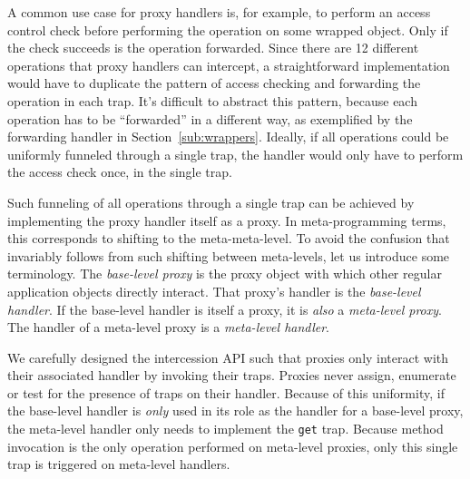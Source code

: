 \documentclass{sig-alternate}
\begin{document}
A common use case for proxy handlers is, for example, to perform an access control check before performing the operation on some wrapped object. Only if the check succeeds is the operation forwarded. Since there are 12 different operations that proxy handlers can intercept, a straightforward implementation would have to duplicate the pattern of access checking and forwarding the operation in each trap. It's difficult to abstract this pattern, because each operation has to be ``forwarded'' in a different way, as exemplified by the forwarding handler in Section~\ref{sub:wrappers}. Ideally, if all operations could be uniformly funneled through a single trap, the handler would only have to perform the access check once, in the single trap.

Such funneling of all operations through a single trap can be achieved by implementing the proxy handler itself as a proxy. In meta-programming terms, this corresponds to shifting to the meta-meta-level. To avoid the confusion that invariably follows from such shifting between meta-levels, let us introduce some terminology. The \emph{base-level proxy} is the proxy object with which other regular application objects directly interact. That proxy's handler is the \emph{base-level handler}. If the base-level handler is itself a proxy, it is \emph{also} a \emph{meta-level proxy}. The handler of a meta-level proxy is a \emph{meta-level handler}.

We carefully designed the intercession API such that proxies only interact with their associated handler by invoking their traps. Proxies never assign, enumerate or test for the presence of traps on their handler. Because of this uniformity, if the base-level handler is \emph{only} used in its role as the handler for a base-level proxy, the meta-level handler only needs to implement the \texttt{get} trap. Because method invocation is the only operation performed on meta-level proxies, only this single trap is triggered on meta-level handlers.

\end{document}
